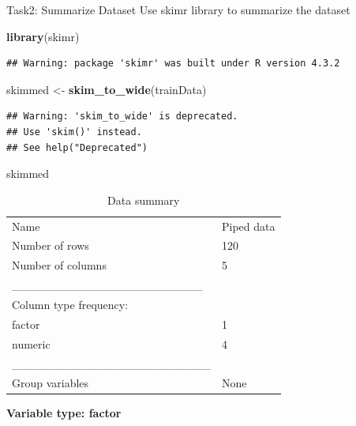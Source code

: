 \documentclass[
]{article}
\newenvironment{Shaded}{\begin{snugshade}}{\end{snugshade}}
\newcommand{\FunctionTok}[1]{\textcolor[rgb]{0.13,0.29,0.53}{\textbf{#1}}}
\newcommand{\NormalTok}[1]{#1}
\newcommand{\OtherTok}[1]{\textcolor[rgb]{0.56,0.35,0.01}{#1}}
\begin{document}
Task2: Summarize Dataset Use skimr library to summarize the dataset

\begin{Shaded}
\begin{Highlighting}[]
\FunctionTok{library}\NormalTok{(skimr)}
\end{Highlighting}
\end{Shaded}

\begin{verbatim}
## Warning: package 'skimr' was built under R version 4.3.2
\end{verbatim}

\begin{Shaded}
\begin{Highlighting}[]
\NormalTok{skimmed }\OtherTok{\textless{}{-}} \FunctionTok{skim\_to\_wide}\NormalTok{(trainData)}
\end{Highlighting}
\end{Shaded}

\begin{verbatim}
## Warning: 'skim_to_wide' is deprecated.
## Use 'skim()' instead.
## See help("Deprecated")
\end{verbatim}

\begin{Shaded}
\begin{Highlighting}[]
\NormalTok{skimmed}
\end{Highlighting}
\end{Shaded}

\begin{longtable}[]{@{}ll@{}}
\caption{Data summary}\tabularnewline
\toprule\noalign{}
\endfirsthead
\endhead
\bottomrule\noalign{}
\endlastfoot
Name & Piped data \\
Number of rows & 120 \\
Number of columns & 5 \\
\_\_\_\_\_\_\_\_\_\_\_\_\_\_\_\_\_\_\_\_\_\_\_ & \\
Column type frequency: & \\
factor & 1 \\
numeric & 4 \\
\_\_\_\_\_\_\_\_\_\_\_\_\_\_\_\_\_\_\_\_\_\_\_\_ & \\
Group variables & None \\
\end{longtable}

\textbf{Variable type: factor}
\end{document}
